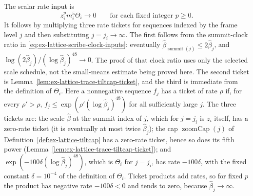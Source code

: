 The scalar rate input is
\begin{equation}
 z_i^p m_i^5\Theta_i\longrightarrow0
 \qquad\text{for each fixed integer }p\geq0.
 \label{eq:ex-trace-small-means-rate}
\end{equation}
It follows by multiplying three rate tickets
for sequences indexed by the frame level $j$ and then substituting
$j=j_i\to\infty$. The first follows from the summit-clock ratio
in \eqref{eq:ex-lattice-scribe-clock-inputs}: eventually
$\widehat\beta_{\operatorname{summit}(j)}\le2\widehat\beta_j$, and
$\log(2\widehat\beta_j)/(\log\widehat\beta_j)^{48}\to0$.
The proof of that clock ratio uses only the selected scale schedule,
not the small-means estimate being proved here. The second ticket is
Lemma~\ref{lem:ex-lattice-trace-tiltcap-ticket}, and the third is
immediate from the definition of $\Theta_i$. Here a nonnegative sequence $f_j$ has a ticket of rate
$\rho$ if, for every $\rho'>\rho$,
$f_j\le\exp(\rho'(\log\widehat\beta_j)^{48})$ for all sufficiently large
$j$. The three tickets are:
the scale $\widehat\beta$ at the summit index of $j$, which for $j=j_i$
is $z_i$ itself, has a zero-rate ticket (it is eventually at most twice
$\widehat\beta_j$); the cap $\operatorname{zoomCap}(j)$ of
Definition~\ref{def:ex-lattice-tiltcap} has a zero-rate
ticket, hence so does its fifth power
(Lemma~\ref{lem:ex-lattice-trace-tiltcap-ticket}); and
$\exp(-100\delta(\log\widehat\beta_j)^{48})$, which is $\Theta_i$ for
$j=j_i$,
has rate $-100\delta$, with the fixed constant $\delta=10^{-4}$ of the
definition of $\Theta_i$.
Ticket products add rates, so for fixed $p$ the product has negative rate
$-100\delta<0$ and tends to zero, because
$\widehat\beta_j\to\infty$.

